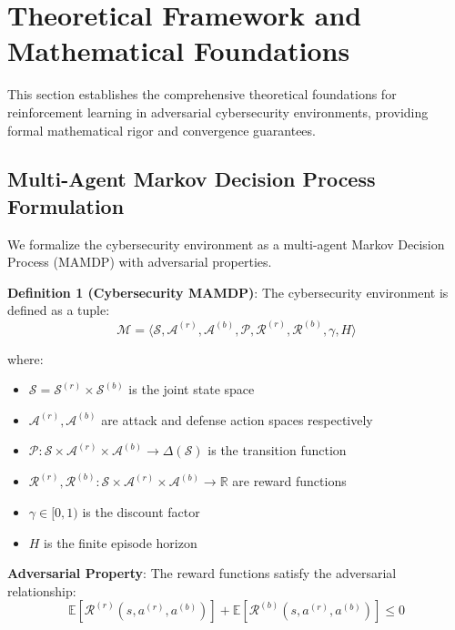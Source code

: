 \documentclass[12pt]{article}
\theoremstyle{definition}
\theoremstyle{plain}
\begin{document}
\section{Theoretical Framework and Mathematical Foundations}

This section establishes the comprehensive theoretical foundations for reinforcement learning in adversarial cybersecurity environments, providing formal mathematical rigor and convergence guarantees.

\subsection{Multi-Agent Markov Decision Process Formulation}

We formalize the cybersecurity environment as a multi-agent Markov Decision Process (MAMDP) with adversarial properties.

\textbf{Definition 1 (Cybersecurity MAMDP)}: The cybersecurity environment is defined as a tuple:
\begin{equation}
\mathcal{M} = \langle \mathcal{S}, \mathcal{A}^{(r)}, \mathcal{A}^{(b)}, \mathcal{P}, \mathcal{R}^{(r)}, \mathcal{R}^{(b)}, \gamma, H \rangle
\end{equation}

where:
\begin{itemize}
    \item $\mathcal{S} = \mathcal{S}^{(r)} \times \mathcal{S}^{(b)}$ is the joint state space
    \item $\mathcal{A}^{(r)}, \mathcal{A}^{(b)}$ are attack and defense action spaces respectively
    \item $\mathcal{P}: \mathcal{S} \times \mathcal{A}^{(r)} \times \mathcal{A}^{(b)} \rightarrow \Delta(\mathcal{S})$ is the transition function
    \item $\mathcal{R}^{(r)}, \mathcal{R}^{(b)}: \mathcal{S} \times \mathcal{A}^{(r)} \times \mathcal{A}^{(b)} \rightarrow \mathbb{R}$ are reward functions
    \item $\gamma \in [0,1)$ is the discount factor
    \item $H$ is the finite episode horizon
\end{itemize}

\textbf{Adversarial Property}: The reward functions satisfy the adversarial relationship:
\begin{equation}
\mathbb{E}[\mathcal{R}^{(r)}(s,a^{(r)},a^{(b)})] + \mathbb{E}[\mathcal{R}^{(b)}(s,a^{(r)},a^{(b)})] \leq 0
\end{equation}
\end{document}
